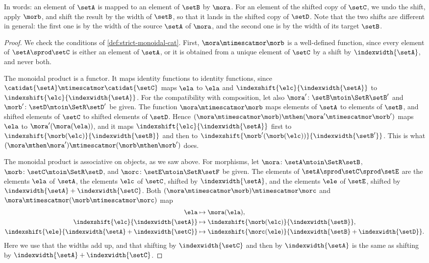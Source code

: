 In words: an element of $\setA$ is mapped to an element of $\setB$ by $\mora$.
For an element of the shifted copy of $\setC$, we undo the shift, apply $\morb$, and shift the result by the width of $\setB$, so that it lands in the shifted copy of $\setD$.
Note that the two shifts are different in general: the first one is by the width of the source $\setA$ of $\mora$, and the second one is by the width of its target $\setB$.

\begin{proof}
    We check the conditions of \cref{def:strict-monoidal-cat}.
    First, $\mora \mtimescatmor \morb$ is a well-defined function, since every element of $\setA \sprod \setC$ is either an element of $\setA$, or it is obtained from a unique element of $\setC$ by a shift by $\indexwidth{\setA}$, and never both.

    The monoidal product is a functor.
    It maps identity functions to identity functions, since $\catidat{\setA} \mtimescatmor \catidat{\setC}$ maps $\ela$ to $\ela$ and $\indexshift{\elc}{\indexwidth{\setA}}$ to $\indexshift{\elc}{\indexwidth{\setA}}$.
    For the compatibility with composition, let also $\mora' \colon \setB \mtoin\SetR \setB'$ and $\morb' \colon \setD \mtoin\SetR \setD'$ be given.
    The function $\mora \mtimescatmor \morb$ maps elements of $\setA$ to elements of $\setB$, and shifted elements of $\setC$ to shifted elements of $\setD$.
    Hence $(\mora \mtimescatmor \morb) \mthen (\mora' \mtimescatmor \morb')$ maps $\ela$ to $\mora'(\mora(\ela))$, and it maps $\indexshift{\elc}{\indexwidth{\setA}}$ first to $\indexshift{\morb(\elc)}{\indexwidth{\setB}}$ and then to $\indexshift{\morb'(\morb(\elc))}{\indexwidth{\setB'}}$.
    This is what $(\mora \mthen \mora') \mtimescatmor (\morb \mthen \morb')$ does.

    The monoidal product is associative on objects, as we saw above.
    For morphisms, let $\mora \colon \setA \mtoin\SetR \setB$, $\morb \colon \setC \mtoin\SetR \setD$, and $\morc \colon \setE \mtoin\SetR \setF$ be given.
    The elements of $\setA \sprod \setC \sprod \setE$ are the elements $\ela$ of $\setA$, the elements $\elc$ of $\setC$, shifted by $\indexwidth{\setA}$, and the elements $\ele$ of $\setE$, shifted by $\indexwidth{\setA} + \indexwidth{\setC}$.
    Both $(\mora \mtimescatmor \morb) \mtimescatmor \morc$ and $\mora \mtimescatmor (\morb \mtimescatmor \morc)$ map
    \begin{equation}
        \begin{aligned}
            \ela                                                 & \mapsto \mora(\ela), \\
            \indexshift{\elc}{\indexwidth{\setA}}                    & \mapsto \indexshift{\morb(\elc)}{\indexwidth{\setB}}, \\
            \indexshift{\ele}{\indexwidth{\setA} + \indexwidth{\setC}} & \mapsto \indexshift{\morc(\ele)}{\indexwidth{\setB} + \indexwidth{\setD}}.
        \end{aligned}
    \end{equation}
    Here we use that the widths add up, and that shifting by $\indexwidth{\setC}$ and then by $\indexwidth{\setA}$ is the same as shifting by $\indexwidth{\setA} + \indexwidth{\setC}$.


\end{proof}
